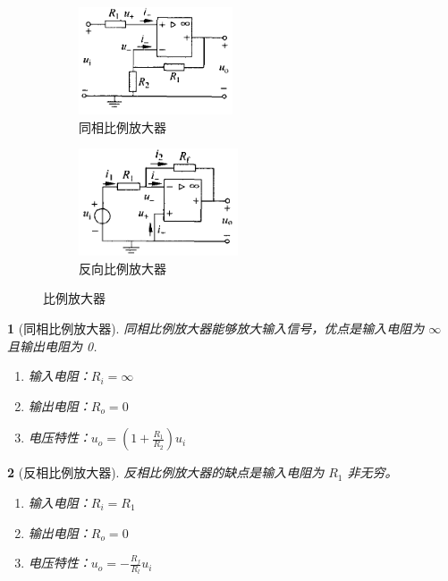\documentclass[UTF8]{report}
\theoremstyle{MyLineTheoremStyle} %
\theoremstyle{MyBlockTheoremStyle} %
\theoremstyle{MySubsubsectionStyle} %
\newtheorem{definition}{}
\begin{document}
\begin{figure}[H]\centering
    \begin{subfigure}[t]{0.37\textwidth}\centering
        \includegraphics[height=90pt]{assets/1,2/同相比例放大器.png}
        \caption{ 同相比例放大器}
    \end{subfigure}\begin{subfigure}[t]{0.37\textwidth}\centering
        \includegraphics[height=90pt]{assets/1,2/反向比例放大器.png}
        \caption{ 反向比例放大器}
    \end{subfigure}
    \caption{ 比例放大器}
\end{figure}

\begin{definition}[同相比例放大器]
同相比例放大器能够放大输入信号，优点是输入电阻为 $\infty$ 且输出电阻为 0.
\begin{enumerate}
\item 输入电阻：$R_i = \infty$
\item 输出电阻：$R_o = 0$
\item 电压特性：$u_o = (1+\frac{R_1}{R_2})u_i$
\end{enumerate}
\end{definition}


\begin{definition}[反相比例放大器]
反相比例放大器的缺点是输入电阻为 $R_1$ 非无穷。
\begin{enumerate}
\item 输入电阻：$R_i = R_1$
\item 输出电阻：$R_o = 0$
\item 电压特性：$u_o = - \frac{R_f}{R_l} u_i$
\end{enumerate}
\end{definition}
\end{document}
